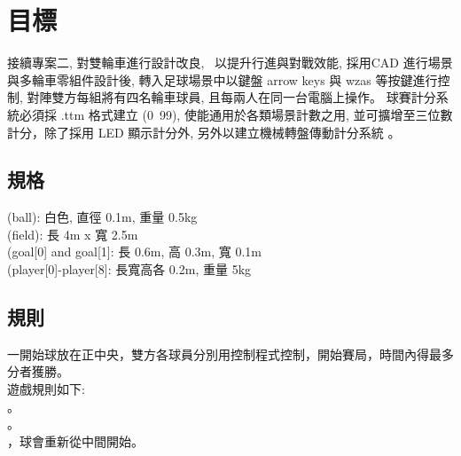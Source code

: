 \chapter{目標}
接續專案二, 對雙輪車進行設計改良,  以提升行進與對戰效能, 採用CAD 進行場景與多輪車零組件設計後, 轉入足球場景中以鍵盤 arrow keys 與 wzas 等按鍵進行控制, 對陣雙方每組將有四名輪車球員, 且每兩人在同一台電腦上操作。
球賽計分系統必須採 .ttm 格式建立 (0~99), 使能通用於各類場景計數之用, 並可擴增至三位數計分，除了採用 LED 顯示計分外, 另外以建立機械轉盤傳動計分系統 。

\section{規格}
 (ball): 白色, 直徑 0.1m, 重量 0.5kg \\
 (field): 長 4m x 寬 2.5m \\
 (goal[0] and goal[1]: 長 0.6m, 高 0.3m, 寬 0.1m \\
 (player[0]-player[8]: 長寬高各 0.2m, 重量 5kg \\

\section{規則}
一開始球放在正中央，雙方各球員分別用控制程式控制，開始賽局，時間內得最多分者獲勝。 \\
遊戲規則如下: \\
。 \\
。 \\
，球會重新從中間開始。 \\
